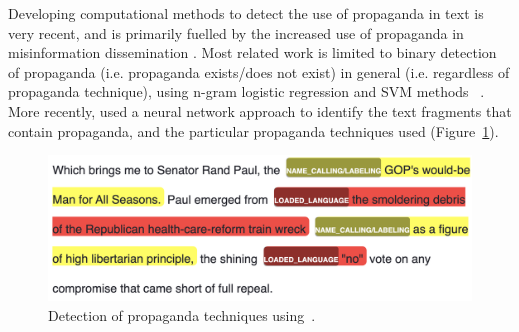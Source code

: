 Developing computational methods to detect the use of propaganda in text is very recent, and is primarily fuelled by the increased use of propaganda in misinformation dissemination \cite{da2020survey}. Most related work is limited to binary detection of propaganda (i.e. propaganda exists/does not exist) in general (i.e. regardless of propaganda technique), using n-gram logistic regression and SVM methods ~\cite{rashkin2017truth,barron2019proppy}. More recently, \citet{da2019fine} used a neural network approach to identify the text fragments that contain propaganda, and the particular propaganda techniques used (Figure~\ref{fig:propaganda_example_1}).





\begin{figure}[!htb]
    \centering
    \includegraphics[width=\linewidth]{figures/propaganda_example_1_color.png}
    \caption{Detection of propaganda techniques using~\citet{baly2020we}.%
    }
    \label{fig:propaganda_example_1}
\end{figure}


